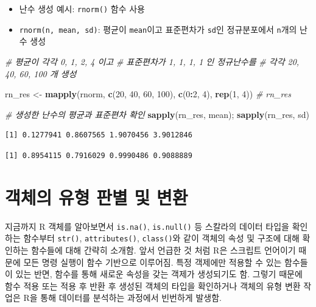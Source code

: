 \documentclass[
  11pt,
]{krantz}
\newenvironment{Shaded}{\begin{snugshade}}{\end{snugshade}}
\newcommand{\CommentTok}[1]{\textcolor[rgb]{0.37,0.37,0.37}{\textit{#1}}}
\newcommand{\DecValTok}[1]{\textcolor[rgb]{0.06,0.06,0.06}{#1}}
\newcommand{\KeywordTok}[1]{\textcolor[rgb]{0.27,0.27,0.27}{\textbf{#1}}}
\newcommand{\NormalTok}[1]{#1}
\newcommand{\OperatorTok}[1]{\textcolor[rgb]{0.43,0.43,0.43}{\textbf{#1}}}
\newcommand{\StringTok}[1]{\textcolor[rgb]{0.5,0.5,0.5}{#1}}
\providecommand{\tightlist}{%
  \setlength{\itemsep}{0pt}\setlength{\parskip}{0pt}}
\begin{document}
\normalsize

\begin{itemize}
\tightlist
\item
  난수 생성 예시: \texttt{rnorm()} 함수 사용
\item
  \texttt{rnorm(n,\ mean,\ sd)}: 평균이 \texttt{mean}이고 표준편차가 \texttt{sd}인 정규분포에서 \texttt{n}개의 난수 생성
\end{itemize}

\footnotesize

\begin{Shaded}
\begin{Highlighting}[]
\CommentTok{# 평균이 각각 0, 1, 2, 4 이고}
\CommentTok{# 표준편차가 1, 1, 1, 1 인 정규난수를 }
\CommentTok{# 각각 20, 40, 60, 100 개 생성}

\NormalTok{rn_res <-}\StringTok{ }\KeywordTok{mapply}\NormalTok{(rnorm, }
                 \KeywordTok{c}\NormalTok{(}\DecValTok{20}\NormalTok{, }\DecValTok{40}\NormalTok{, }\DecValTok{60}\NormalTok{, }\DecValTok{100}\NormalTok{), }
                 \KeywordTok{c}\NormalTok{(}\DecValTok{0}\OperatorTok{:}\DecValTok{2}\NormalTok{, }\DecValTok{4}\NormalTok{), }
                 \KeywordTok{rep}\NormalTok{(}\DecValTok{1}\NormalTok{, }\DecValTok{4}\NormalTok{))}
\CommentTok{# rn_res}

\CommentTok{# 생성한 난수의 평균과 표준편차 확인}
\KeywordTok{sapply}\NormalTok{(rn_res, mean); }\KeywordTok{sapply}\NormalTok{(rn_res, sd)}
\end{Highlighting}
\end{Shaded}

\begin{verbatim}
[1] 0.1277941 0.8607565 1.9070456 3.9012846
\end{verbatim}

\begin{verbatim}
[1] 0.8954115 0.7916029 0.9990486 0.9088889
\end{verbatim}

\normalsize

\hypertarget{is-as-function}{%
\section{객체의 유형 판별 및 변환}\label{is-as-function}}

지금까지 R 객체를 알아보면서 \texttt{is.na()}, \texttt{is.null()} 등 스칼라의 데이터 타입을 확인하는 함수부터 \texttt{str()}, \texttt{attributes()}, \texttt{class()}와 같이 객체의 속성 및 구조에 대해 확인하는 함수들에 대해 간략히 소개함. 앞서 언급한 것 처럼 R은 스크립트 언어이기 때문에 모든 명령 실행이 함수 기반으로 이루어짐. 특정 객제에만 적용할 수 있는 함수들이 있는 반면, 함수를 통해 새로운 속성을 갖는 객제가 생성되기도 함. 그렇기 때문에 함수 적용 또는 적용 후 반환 후 생성된 객체의 타입을 확인하거나 객체의 유형 변환 작업은 R을 통해 데이터를 분석하는 과정에서 빈번하게 발생함.
\end{document}
